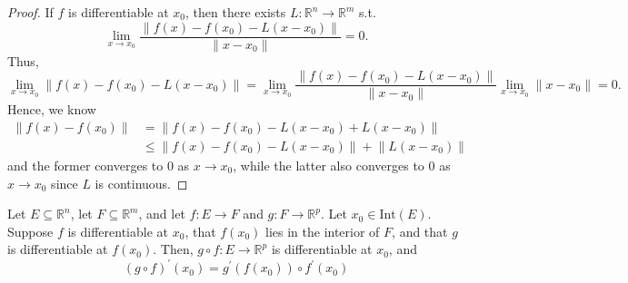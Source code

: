 \begin{proof}
    If \(f\) is differentiable at \(x_0\), then there exists \(L: \mathbb{R} ^n \to \mathbb{R} ^m\) s.t. 
    \[
        \lim_{x \to x_0} \frac{\lVert f(x) - f(x_0) - L(x - x_0) \rVert }{\lVert x - x_0 \rVert } = 0. 
    \]   
    Thus,
    \[
        \lim_{x \to x_0} \lVert f(x) - f(x_0) - L(x - x_0) \rVert = \lim_{x \to x_0} \frac{\lVert f(x) - f(x_0) - L(x - x_0) \rVert }{\lVert x - x_0 \rVert } \lim_{x \to x_0} \lVert x - x_0 \rVert = 0.    
    \]
    Hence, we know
    \begin{align*}
        \lVert f(x) - f(x_0) \rVert &= \lVert f(x) - f(x_0) - L(x - x_0) + L(x - x_0) \rVert \\
        &\le \lVert f(x) - f(x_0) - L(x - x_0) \rVert + \lVert L(x - x_0) \rVert    
    \end{align*}
    and the former converges to \(0\) as \(x \to x_0\), while the latter also converges to \(0\) as \(x \to x_0\) since \(L\) is continuous.      
\end{proof}

\begin{theorem}
    Let \(E \subseteq \mathbb{R} ^n\), let \(F \subseteq \mathbb{R} ^m\), and let \(f: E \to F\) and \(g: F \to \mathbb{R} ^p\). Let \(x_0 \in \mathrm{Int}(E) \). Suppose \(f\) is differentiable at \(x_0\), that \(f(x_0)\) lies in the interior of \(F\), and that \(g\) is differentiable at \(f(x_0)\). Then, \(g \circ f : E \to \mathbb{R} ^p\) is differentiable at \(x_0\), and
    \[
        \left( g \circ f \right)^{\prime} (x_0) = g^{\prime} (f(x_0)) \circ f^{\prime} (x_0) 
    \]             
\end{theorem}

